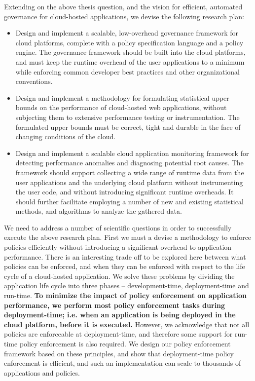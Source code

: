 Extending on the above thesis question, and the vision for efficient, automated governance for
cloud-hosted applications, we devise the following research plan:

\begin{itemize}
\item Design and implement a scalable, low-overhead governance framework for cloud platforms,
complete with a policy specification language and a policy engine. The governance framework should be
built into the cloud platforms, and must
keep the runtime overhead of the user applications to a minimum while enforcing
common developer best practices and other organizational conventions.
\item Design and implement a methodology for formulating statistical upper bounds on the
performance of cloud-hosted web applications, without
 subjecting them to extensive performance testing or instrumentation. The formulated
upper bounds must be correct, tight and durable in the face of changing
 conditions of the cloud.
 \item Design and implement a scalable cloud application monitoring framework for detecting
performance anomalies and diagnosing potential root causes. 
The framework should support collecting
 a wide range of runtime data from the user applications and the underlying cloud platform
 without instrumenting the user code, and without introducing significant runtime overheads.
 It should further facilitate employing a number of new and existing statistical methods,
 and algorithms to analyze the gathered data.
\end{itemize}

We need to address a number of scientific questions in order to successfully execute the 
above research plan. First we must a devise a methodology to enforce policies efficiently
without introducing a significant overhead to application performance. There is an interesting
trade off to be explored here between what policies can be enforced, and when they can be enforced with respect
to the life cycle of a cloud-hosted application. We solve these problems by dividing the application
life cycle into three phases -- development-time, deployment-time and run-time. \textbf{To minimize the
impact of policy enforcement on application performance, we perform most policy
enforcement tasks during deployment-time; i.e. when an application is being deployed in the 
cloud platform, before it is executed.} However, we acknowledge that not all policies
are enforceable at deployment-time, and therefore some support for run-time policy enforcement
is also required. We design our policy enforcement framework based on these principles, and 
show that deployment-time policy enforcement is efficient, and such an implementation can scale
to thousands of applications and policies.

